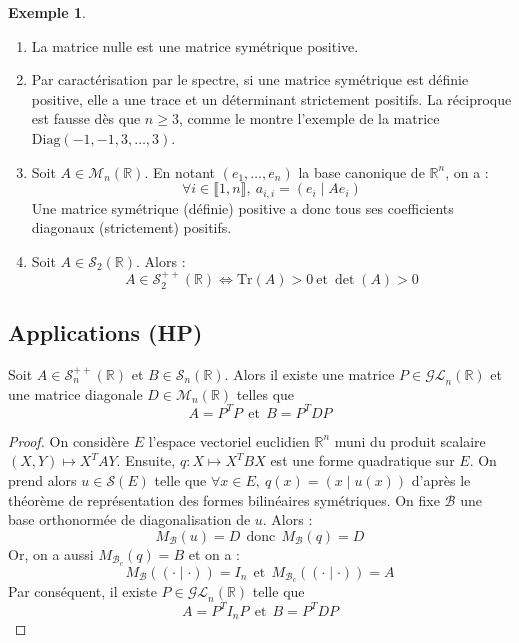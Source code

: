\documentclass[french]{article}
\newcommand{\R}{\mathbb{R}}
\newcommand{\Tr}{\text{Tr}}
\theoremstyle{plain}
\theoremstyle{definition}
\newtheorem*{ex}{Exemple}
\theoremstyle{remark}
\begin{document}
\begin{ex}
	\begin{enumerate}
		\item La matrice nulle est une matrice symétrique positive.
		\item Par caractérisation par le spectre, si une matrice symétrique est définie positive, elle a une trace et un déterminant strictement positifs. La réciproque est fausse dès que $n\geqslant 3$, comme le montre l'exemple de la matrice $\text{Diag}(-1,-1,3,\ldots,3)$.
		\item Soit $A\in\mathcal{M}_n(\R)$. En notant $(e_1,\ldots,e_n)$ la base canonique de $\R^n$, on a : $$\forall i\in\llbracket1,n\rrbracket,\ a_{i,i}=(e_i\mid Ae_i)$$ Une matrice symétrique (définie) positive a donc tous ses coefficients diagonaux (strictement) positifs.
		\item Soit $A\in\mathcal{S}_2(\R)$. Alors : $$A\in\mathcal{S}_2^{++}(\R)\iff \Tr(A)>0\ \text{et}\ \det(A)>0$$
	\end{enumerate}
\end{ex}

\subsection{Applications (HP)}

\begin{thm}
	Soit $A\in\mathcal{S}_n^{++}(\R)$ et $B\in\mathcal{S}_n(\R)$. Alors il existe une matrice $P\in\mathcal{GL}_n(\R)$ et une matrice diagonale $D\in\mathcal{M}_n(\R)$ telles que $$A=P^TP\ \ \text{et}\ \ B=P^TDP$$
\end{thm}

\begin{proof}
	On considère $E$ l'espace vectoriel euclidien $\R^n$ muni du produit scalaire $(X,Y)\mapsto X^TAY$. Ensuite, $q:X\mapsto X^TBX$ est une forme quadratique sur $E$. On prend alors $u\in\mathcal{S}(E)$ telle que $\forall x\in E,\ q(x)=(x\mid u(x))$ d'après le théorème de représentation des formes bilinéaires symétriques. On fixe $\mathcal{B}$ une base orthonormée de diagonalisation de $u$. Alors : $$M_\mathcal{B}(u)=D\ \ \text{donc} \ \ M_\mathcal{B}(q)=D$$ Or, on a aussi $M_{\mathcal{B}_c}(q)=B$ et on a : $$M_\mathcal{B}((\cdot\mid\cdot))=I_n \ \ \text{et} \ \ M_{\mathcal{B}_c}((\cdot\mid\cdot))=A$$ Par conséquent, il existe $P\in\mathcal{GL}_n(\R)$ telle que $$A=P^TI_nP\ \ \text{et}\ \ B=P^TDP$$
\end{proof}
\end{document}

